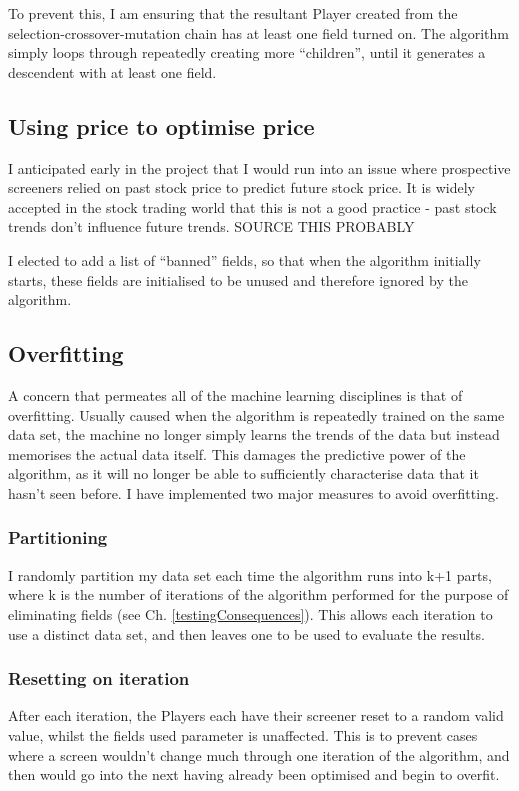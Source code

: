 To prevent this, I am ensuring that the resultant Player created from the selection-crossover-mutation chain has at least one field turned on. The algorithm simply loops through repeatedly creating more ``children'', until it generates a descendent with at least one field.

\subsection{Using price to optimise price}
I anticipated early in the project that I would run into an issue where prospective screeners relied on past stock price to predict future stock price. It is widely accepted in the stock trading world that this is not a good practice - past stock trends don't influence future trends. SOURCE THIS PROBABLY \newline

I elected to add a list of ``banned'' fields, so that when the algorithm initially starts, these fields are initialised to be unused and therefore ignored by the algorithm.

\subsection{Overfitting}
A concern that permeates all of the machine learning disciplines is that of overfitting. Usually caused when the algorithm is repeatedly trained on the same data set, the machine no longer simply learns the trends of the data but instead memorises the actual data itself. This damages the predictive power of the algorithm, as it will no longer be able to sufficiently characterise data that it hasn't seen before. I have implemented two major measures to avoid overfitting.

\subsubsection{Partitioning} \label{partition}
I randomly partition my data set each time the algorithm runs into k+1 parts, where k is the number of iterations of the algorithm performed for the purpose of eliminating fields (see Ch. \ref{testingConsequences}). This allows each iteration to use a distinct data set, and then leaves one to be used to evaluate the results.

\subsubsection{Resetting on iteration} \label{iterReset}
After each iteration, the Players each have their screener reset to a random valid value, whilst the fields used parameter is unaffected. This is to prevent cases where a screen wouldn't change much through one iteration of the algorithm, and then would go into the next having already been optimised and begin to overfit. \newline

